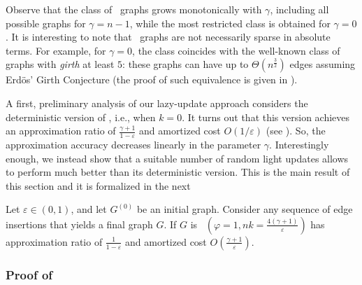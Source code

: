
Observe that the class of \gammaok\ graphs grows monotonically with $\gamma$, including all possible graphs for $\gamma=n-1$, while the most restricted class is obtained for $\gamma=0$. It is interesting to note that \gammaok\ graphs are not necessarily sparse in absolute terms. For example, for $\gamma=0$, the class coincides with the well-known class of graphs with \emph{girth} at least $5$: these graphs can have up to $\Theta(n^{\frac{3}{2}})$ edges assuming Erd{\"o}s' Girth Conjecture \cite{erdos1965some} (the proof of such equivalence is given in ).

A first, preliminary analysis of our lazy-update approach considers the deterministic version of , i.e., when $k = 0$. It turns out that this version achieves an approximation ratio of  $\frac{\gamma + 1}{1-\varepsilon}$ and amortized cost $O(1/\varepsilon)$ (see ). So, the approximation accuracy decreases linearly in the parameter $\gamma$. 
Interestingly enough, we instead show that a suitable number of random light updates allows  to perform much better than its deterministic version. This is the main result of this section and it is formalized in the next 

\begin{theorem}\label{thm:gamma-ok-main}
Let $\varepsilon \in (0,1)$, and let $G^{(0)}$ be an initial graph. Consider any sequence of edge insertions that yields a final graph $G$. If $G$ is \gammaok\, \lazyscheme$\left(\varphi =1,nk=\frac{4(\gamma+1)}{\varepsilon}\right)$ has approximation ratio of $\frac{1}{1-\varepsilon}$ and amortized cost $O\left(\frac{\gamma+1}{\varepsilon}\right)$.     
\end{theorem}


\subsubsection*{Proof of }

